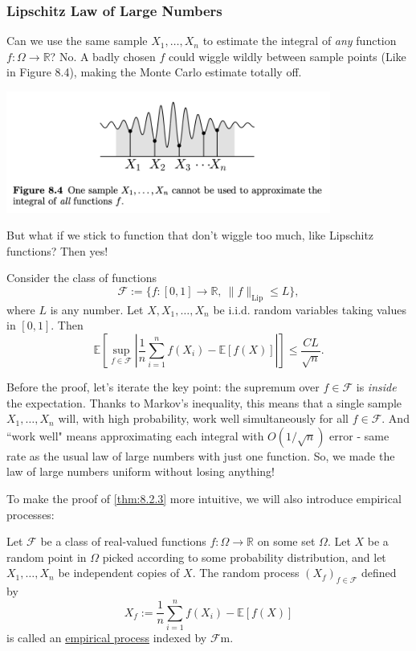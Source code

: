 \subsubsection{Lipschitz Law of Large Numbers}
Can we use the same sample $X_1, \dots, X_n$ to estimate the integral of \textit{any} function $f: \Omega \to 
\mathbb{R}$? No. A badly chosen $f$ could wiggle wildly between sample points (Like in Figure 8.4), making the 
Monte Carlo estimate totally off.

\begin{center}
	\includegraphics[width=0.8\textwidth]{Chapter 8/fig8-4.png}
\end{center}

But what if we stick to function that don't wiggle too much, like Lipschitz functions? Then yes!

\begin{theorem}
\label{thm:8.2.3}
Consider the class of functions 
\[ \mathcal{F} := \{ f: [0, 1] \to \mathbb{R}, \ \lVert f \rVert_{\mathrm{Lip}} \leq L \}, \]
where $L$ is any number. Let $X, X_1, \dots, X_n$ be i.i.d. random variables taking values in $[0, 1]$. Then 
\[ \mathbb{E}\left[ \sup_{f \in \mathcal{F}}\left| \frac{1}{n}\sum_{i = 1}^{n}f(X_i) - 
\mathbb{E}\left[ f(X) \right] \right| \right] \leq \frac{CL}{\sqrt{n}}. \]
\end{theorem}

\begin{remark}
\label{rmk:8.2.4}
Before the proof, let's iterate the key point: the supremum over $f \in \mathcal{F}$ is \textit{inside} the 
expectation. Thanks to Markov's inequality, this means that a single sample $X_1, \dots, X_n$ will, with high 
probability, work well simultaneously for all $f \in \mathcal{F}$. And ``work well" means approximating each 
integral with $O(1/\sqrt{n})$ error - same rate as the usual law of large numbers with just one function. So, 
we made the law of large numbers uniform without losing anything!
\end{remark}

To make the proof of \cref{thm:8.2.3} more intuitive, we will also introduce empirical processes:
\begin{definition}[]
\label{def:8.2.5}
Let $\mathcal{F}$ be a class of real-valued functions $f: \Omega \to \mathbb{R}$ on some set $\Omega$. Let $X$ 
be a random point in $\Omega$ picked according to some probability distribution, and let $X_1, \dots, X_n$ be 
independent copies of $X$. The random process $(X_f)_{f \in \mathcal{F}}$ defined by 
\[ X_f := \frac{1}{n}\sum_{i = 1}^{n}f(X_i) - \mathbb{E}\left[ f(X) \right] \]
is called an \underline{empirical process} indexed by $\mathcal{F}$m.
\end{definition}

